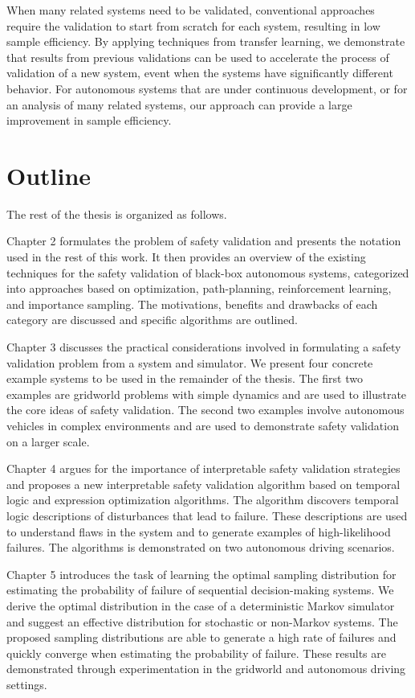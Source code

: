 When many related systems need to be validated, conventional approaches require the validation to start from scratch for each system, resulting in low sample efficiency. By applying techniques from transfer learning, we demonstrate that results from previous validations can be used to accelerate the process of validation of a new system, event when the systems have significantly different behavior. For autonomous systems that are under continuous development, or for an analysis of many related systems, our approach can provide a large improvement in sample efficiency.


\section{Outline}
The rest of the thesis is organized as follows. 

Chapter 2 formulates the problem of safety validation and presents the notation used in the rest of this work. It then provides an overview of the existing techniques for the safety validation of black-box autonomous systems, categorized into approaches based on optimization, path-planning, reinforcement learning, and importance sampling. The motivations, benefits and drawbacks of each category are discussed and specific algorithms are outlined. 

Chapter 3 discusses the practical considerations involved in formulating a safety validation problem from a system and simulator. We present four concrete example systems to be used in the remainder of the thesis. The first two examples are gridworld problems with simple dynamics and are used to illustrate the core ideas of safety validation. The second two examples involve autonomous vehicles in complex environments and are used to demonstrate safety validation on a larger scale. 

Chapter 4 argues for the importance of interpretable safety validation strategies and proposes a new interpretable safety validation algorithm based on temporal logic and expression optimization algorithms. The algorithm discovers temporal logic descriptions of disturbances that lead to failure. These descriptions are used to understand flaws in the system and to generate examples of high-likelihood failures. The algorithms is demonstrated on two autonomous driving scenarios. 

Chapter 5 introduces the task of learning the optimal sampling distribution for estimating the probability of failure of sequential decision-making systems. We derive the optimal distribution in the case of a deterministic Markov simulator and suggest an effective distribution for stochastic or non-Markov systems. The proposed sampling distributions are able to generate a high rate of failures and quickly converge when estimating the probability of failure. These results are demonstrated through experimentation in the gridworld and autonomous driving settings.


